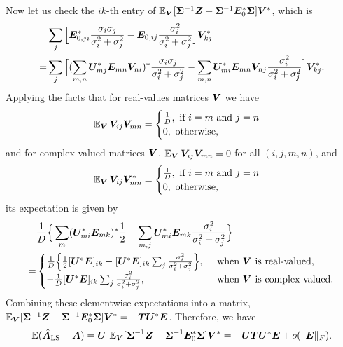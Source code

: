 Now let us check the $ik$-th entry of $\operatorname{\mathbb{E}}_{\boldsymbol{V}}[\boldsymbol\Sigma^{-1}\boldsymbol{Z}+\boldsymbol\Sigma^{-1}\boldsymbol{E}_0^*\boldsymbol\Sigma]\boldsymbol{V}^*$, which is
\begin{align*}
&\sum_{j}\Big[\boldsymbol{E}_{0,ji}^*\frac{\sigma_i\sigma_j}{\sigma_i^2+\sigma_j^2}-\boldsymbol{E}_{0,ij}\frac{\sigma_i^2}{\sigma_i^2+\sigma_j^2}\Big]\boldsymbol{V}_{kj}^*\\
=&\sum_{j}\Big[(\sum_{m,n}\boldsymbol{U}^*_{mj}\boldsymbol{E}_{mn}\boldsymbol{V}_{ni})^*\frac{\sigma_i\sigma_j}{\sigma_i^2+\sigma_j^2}-\sum_{m,n}\boldsymbol{U}^*_{mi}\boldsymbol{E}_{mn}\boldsymbol{V}_{nj}\frac{\sigma_i^2}{\sigma_i^2+\sigma_j^2}\Big]\boldsymbol{V}_{kj}^*.\end{align*}
Applying the facts that for real-values matrices $\boldsymbol{V}$ we have
\[
\operatorname{\mathbb{E}}_{\boldsymbol{V}}\boldsymbol{V}_{ij}\boldsymbol{V}_{mn}=\begin{cases} \frac{1}{D},\,\,\text{if $i=m$ and $j=n$}\\
0,\,\,\text{otherwise},
\end{cases}
\]
and for complex-valued matrices $\boldsymbol{V}$, $\operatorname{\mathbb{E}}_{\boldsymbol{V}}\boldsymbol{V}_{ij}\boldsymbol{V}_{mn}=0$ for all $(i,j,m,n)$, and
\[
\operatorname{\mathbb{E}}_{\boldsymbol{V}}\boldsymbol{V}_{ij}\boldsymbol{V}_{mn}^*=\begin{cases} \frac{1}{D},\,\,\text{if $i=m$ and $j=n$}\\
0,\,\,\text{otherwise},
\end{cases}
\]
its expectation is given by
\begin{align*}&\frac{1}{D}\Big\{\sum_{m}(\boldsymbol{U}_{mi}^*\boldsymbol{E}_{mk})^*\frac{1}{2} - \sum_{m,j}\boldsymbol{U}_{mi}^*\boldsymbol{E}_{mk}\frac{\sigma_i^2}{\sigma_i^2+\sigma_j^2}\Big\}\\
=&\begin{cases}\frac{1}{D}\Big\{\frac{1}{2}[\boldsymbol{U}^*\boldsymbol{E}]_{ik} - [\boldsymbol{U}^*\boldsymbol{E}]_{ik}\sum_{j}\frac{\sigma_i^2}{\sigma_i^2+\sigma_j^2}\Big\},\,\,\,&\text{when $\boldsymbol{V}$ is real-valued,}\\
-\frac{1}{D} [\boldsymbol{U}^*\boldsymbol{E}]_{ik}\sum_{j}\frac{\sigma_i^2}{\sigma_i^2+\sigma_j^2},\,\,\,&\text{when $\boldsymbol{V}$ is complex-valued.}
\end{cases}
\end{align*}
Combining these elementwise expectations into a matrix, $\operatorname{\mathbb{E}}_{\boldsymbol{V}}[\boldsymbol\Sigma^{-1}\boldsymbol{Z}-\boldsymbol\Sigma^{-1}\boldsymbol{E}_0^*\boldsymbol\Sigma]\boldsymbol{V}^*=-\boldsymbol{T}\boldsymbol{U}^*\boldsymbol{E}$. Therefore, we have
\begin{equation}
\operatorname{\mathbb{E}}(\hat{\boldsymbol{A}}_{\text{LS}}-\boldsymbol{A})=\boldsymbol{U}\,\operatorname{\mathbb{E}}_{\boldsymbol{V}}[\boldsymbol\Sigma^{-1}\boldsymbol{Z}-\boldsymbol\Sigma^{-1}\boldsymbol{E}_0^*\boldsymbol\Sigma]\boldsymbol{V}^*
=-\boldsymbol{U}\boldsymbol{T}\boldsymbol{U}^*\boldsymbol{E}+o(\|\boldsymbol{E}\|_F).
\end{equation}




